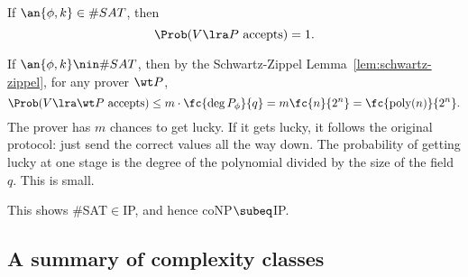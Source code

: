 If $\an{\phi,k}\in \#SAT$, then 
\[\Prob(V\lra P\text{ accepts})=1.\]

If $\an{\phi,k}\nin \#SAT$, then by the Schwartz-Zippel Lemma~\ref{lem:schwartz-zippel}, for any prover $\wt P$, 
\[\Prob(V\lra \wt P \text{ accepts})\le m\cdot \fc{\deg P_{\phi}}{q}=m\fc{n}{2^n}=\fc{\text{poly}(n)}{2^n}.\]
The prover has $m$ chances to get lucky. If it gets lucky, it follows the original protocol: just send the correct values all the way down. The probability of getting lucky at one stage is the degree of the polynomial divided by the size of the field $q$. This is small.

This shows \#SAT$\in$IP, and hence coNP$\subeq$IP.


\subsection{A summary of complexity classes}

